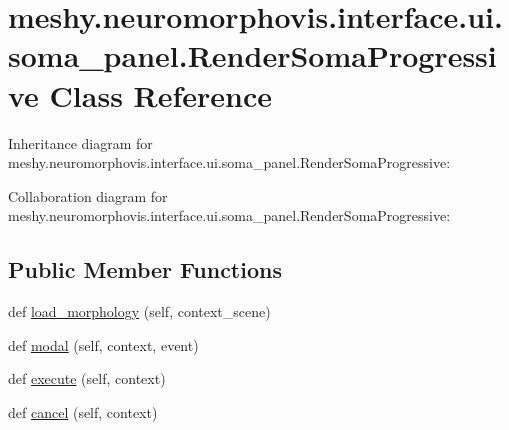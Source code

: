 \hypertarget{classmeshy_1_1neuromorphovis_1_1interface_1_1ui_1_1soma__panel_1_1RenderSomaProgressive}{}\section{meshy.\+neuromorphovis.\+interface.\+ui.\+soma\+\_\+panel.\+Render\+Soma\+Progressive Class Reference}
\label{classmeshy_1_1neuromorphovis_1_1interface_1_1ui_1_1soma__panel_1_1RenderSomaProgressive}


Inheritance diagram for meshy.\+neuromorphovis.\+interface.\+ui.\+soma\+\_\+panel.\+Render\+Soma\+Progressive\+:


Collaboration diagram for meshy.\+neuromorphovis.\+interface.\+ui.\+soma\+\_\+panel.\+Render\+Soma\+Progressive\+:
\subsection*{Public Member Functions}
\begin{DoxyCompactItemize}
\item 
def \hyperlink{classmeshy_1_1neuromorphovis_1_1interface_1_1ui_1_1soma__panel_1_1RenderSomaProgressive_ad5acac538d8e456003111a89d67c15d0}{load\+\_\+morphology} (self, context\+\_\+scene)
\item 
def \hyperlink{classmeshy_1_1neuromorphovis_1_1interface_1_1ui_1_1soma__panel_1_1RenderSomaProgressive_ac02ccbd280e8d2445f5775b2c52f8c82}{modal} (self, context, event)
\item 
def \hyperlink{classmeshy_1_1neuromorphovis_1_1interface_1_1ui_1_1soma__panel_1_1RenderSomaProgressive_a87d724a5b3e02e1837d882ab4d016462}{execute} (self, context)
\item 
def \hyperlink{classmeshy_1_1neuromorphovis_1_1interface_1_1ui_1_1soma__panel_1_1RenderSomaProgressive_abf624c285563c363ca21d3327d38c648}{cancel} (self, context)
\end{DoxyCompactItemize}
